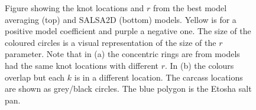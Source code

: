 \documentclass[letterpaper]{interact}
\begin{document}
\begin{figure}[!ht]
     \centering
     \begin{subfloat}{%
    }
    \hspace{1pt}
     \end{subfloat}
    \begin{subfloat}[SALSA 2D]{%
    }
    \hspace{5pt}
    \end{subfloat}
     \caption{Figure showing the knot locations and $r$ from the best model averaging (top) and SALSA2D (bottom) models. Yellow is for a positive model coefficient and purple a negative one. The size of the coloured circles is a visual representation of the size of the $r$ parameter. Note that in (a) the concentric rings are from models had the same knot locations with different $r$. In (b) the colours overlap but each $k$ is in a different location.  The carcass locations are shown as grey/black circles. The blue polygon is the Etosha salt pan.}
        \label{fig:simknots}
\end{figure}
\end{document}
